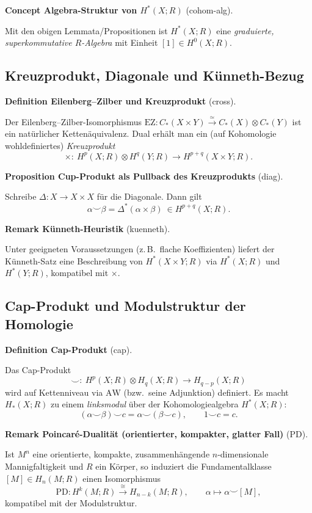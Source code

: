 \documentclass[10pt, letterpaper]{article}
\newcommand{\CustomHeading}[3]{%
  \par\medskip\noindent%
  \textbf{#1 #2} \textnormal{(#3)}.\enskip%
}
\newenvironment{DEF}[2]{\begin{unitbox}\CustomHeading{Definition}{#1}{#2}}{\end{unitbox}}
\newenvironment{PROP}[2]{\begin{unitbox}\CustomHeading{Proposition}{#1}{#2}}{\end{unitbox}}
\newenvironment{REM}[2]{\begin{unitbox}\CustomHeading{Remark}{#1}{#2}}{\end{unitbox}}
\newenvironment{CONC}[2]{\begin{unitbox}\CustomHeading{Concept}{#1}{#2}}{\end{unitbox}}
\begin{document}
\begin{CONC}{Algebra-Struktur von $H^\ast(X;R)$}{cohom-alg}
Mit den obigen Lemmata/Propositionen ist $H^\ast(X;R)$ eine \emph{graduierte, superkommutative $R$-Algebra} 
mit Einheit $[1]\in H^0(X;R)$.
\end{CONC}


\subsection{Kreuzprodukt, Diagonale und Künneth-Bezug}

\begin{DEF}{Eilenberg--Zilber und Kreuzprodukt}{cross}
Der Eilenberg--Zilber-Isomorphismus \( \mathrm{EZ}:C_\ast(X\times Y)\xrightarrow{\simeq} C_\ast(X)\otimes C_\ast(Y)\) ist ein natürlicher Kettenäquivalenz. Dual erhält man ein (auf Kohomologie wohldefiniertes) \emph{Kreuzprodukt}
\[
\times:\ H^p(X;R)\otimes H^q(Y;R)\longrightarrow H^{p+q}(X\times Y;R).
\]
\end{DEF}

\begin{PROP}{Cup-Produkt als Pullback des Kreuzprodukts}{diag}
Schreibe \(\Delta:X\to X\times X\) für die Diagonale. Dann gilt
\[
\alpha\smile\beta=\Delta^\ast(\alpha\times\beta)\ \in H^{p+q}(X;R).
\]
\end{PROP}

\begin{REM}{Künneth-Heuristik}{kuenneth}
Unter geeigneten Voraussetzungen (z.\,B.\ flache Koeffizienten) liefert der Künneth-Satz eine Beschreibung von \(H^\ast(X\times Y;R)\) via \(H^\ast(X;R)\) und \(H^\ast(Y;R)\), kompatibel mit \(\times\).
\end{REM}

\subsection{Cap-Produkt und Modulstruktur der Homologie}

\begin{DEF}{Cap-Produkt}{cap}
Das Cap-Produkt
\[
\smallsmile:\ H^p(X;R)\otimes H_q(X;R)\longrightarrow H_{q-p}(X;R)
\]
wird auf Kettenniveau via \(\mathrm{AW}\) (bzw.\ seine Adjunktion) definiert. Es macht \(H_\ast(X;R)\) zu einem \emph{linksmodul} über der Kohomologiealgebra \(H^\ast(X;R)\):
\[
(\alpha\smile\beta)\smallsmile c=\alpha\smallsmile(\beta\smallsmile c),\qquad
1\smallsmile c=c.
\]
\end{DEF}

\begin{REM}{Poincaré-Dualität (orientierter, kompakter, glatter Fall)}{PD}
Ist \(M^n\) eine orientierte, kompakte, zusammenhängende \(n\)-dimensionale Mannigfaltigkeit und \(R\) ein Körper, so induziert die Fundamentalklasse \([M]\in H_n(M;R)\) einen Isomorphismus
\[
\mathrm{PD}:H^k(M;R)\xrightarrow{\ \cong\ } H_{n-k}(M;R),\qquad \alpha\mapsto \alpha\smallsmile [M],
\]
kompatibel mit der Modulstruktur.
\end{REM}
\end{document}
